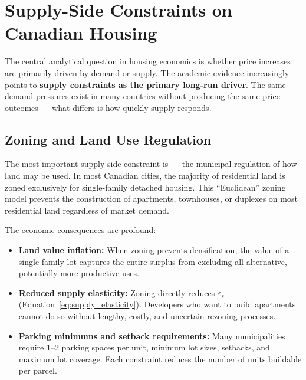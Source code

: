 \section{Supply-Side Constraints on Canadian Housing}
\label{sec:supply_constraints}

The central analytical question in housing economics is whether price
increases are primarily driven by demand or supply. The academic evidence
increasingly points to \textbf{supply constraints as the primary long-run
driver}. The same demand pressures exist in many countries without producing
the same price outcomes --- what differs is how quickly supply responds.

\subsection{Zoning and Land Use Regulation}

The most important supply-side constraint is  --- the municipal
regulation of how land may be used. In most Canadian cities, the majority
of residential land is zoned exclusively for single-family detached housing.
This ``Euclidean'' zoning model prevents the construction of apartments,
townhouses, or duplexes on most residential land regardless of market demand.

The economic consequences are profound:

\begin{itemize}
  \item \textbf{Land value inflation:} When zoning prevents densification,
        the value of a single-family lot captures the entire surplus from
        excluding all alternative, potentially more productive uses.

  \item \textbf{Reduced supply elasticity:} Zoning directly reduces
        $\varepsilon_s$ (Equation~\ref{eq:supply_elasticity}). Developers
        who want to build apartments cannot do so without lengthy, costly,
        and uncertain rezoning processes.

  \item \textbf{Parking minimums and setback requirements:} Many municipalities
        require 1--2 parking spaces per unit, minimum lot sizes, setbacks,
        and maximum lot coverage. Each constraint reduces the number of
        units buildable per parcel.
\end{itemize}

